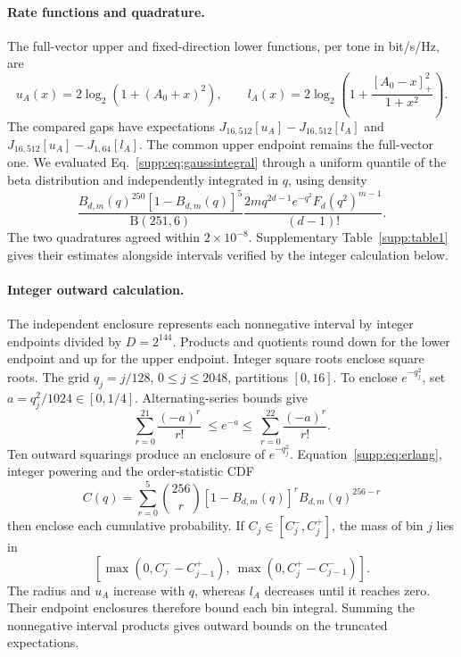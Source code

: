 \documentclass[10pt,letterpaper]{article}
\begin{document}
\paragraph{Rate functions and quadrature.}
The full-vector upper and fixed-direction lower functions, per tone in bit/s/Hz, are
\begin{equation}
 u_A(x)=2\log_2\!\left(1+(A_0+x)^2\right),\qquad
 l_A(x)=2\log_2\!\left(1+\frac{[A_0-x]_+^2}{1+x^2}\right).
 \label{supp:eq:gaussrates}
\end{equation}
The compared gaps have expectations \(J_{16,512}[u_A]-J_{16,512}[l_A]\) and
\(J_{16,512}[u_A]-J_{1,64}[l_A]\). The common upper endpoint remains the full-vector one. We evaluated Eq.~\eqref{supp:eq:gaussintegral} through a uniform quantile of the beta distribution and independently integrated in \(q\), using density
\begin{equation}
 \frac{B_{d,m}(q)^{250}[1-B_{d,m}(q)]^5}{\mathrm B(251,6)}
 \frac{2m q^{2d-1}e^{-q^2}F_d(q^2)^{m-1}}{(d-1)!}.
\end{equation}
The two quadratures agreed within \(2\times10^{-8}\). Supplementary Table~\ref{supp:table1} gives their estimates alongside intervals verified by the integer calculation below.

\paragraph{Integer outward calculation.}
The independent enclosure represents each nonnegative interval by integer endpoints divided by \(D=2^{144}\). Products and quotients round down for the lower endpoint and up for the upper endpoint. Integer square roots enclose square roots. The grid \(q_j=j/128\), \(0\leq j\leq2048\), partitions \([0,16]\). To enclose \(e^{-q_j^2}\), set \(a=q_j^2/1024\in[0,1/4]\). Alternating-series bounds give
\begin{equation}
 \sum_{r=0}^{21}\frac{(-a)^r}{r!}
 \ \leq e^{-a}\leq\
 \sum_{r=0}^{22}\frac{(-a)^r}{r!}.
\end{equation}
Ten outward squarings produce an enclosure of \(e^{-q_j^2}\). Equation~\eqref{supp:eq:erlang}, integer powering and the order-statistic CDF
\begin{equation}
 C(q)=\sum_{r=0}^{5}\binom{256}{r}
       [1-B_{d,m}(q)]^r B_{d,m}(q)^{256-r}
 \label{supp:eq:ordercdf}
\end{equation}
then enclose each cumulative probability. If \(C_j\in[C_j^-,C_j^+]\), the mass of bin \(j\) lies in
\[
 \left[\max(0,C_j^--C_{j-1}^+),\
       \max(0,C_j^+-C_{j-1}^-)\right].
\]
The radius and \(u_A\) increase with \(q\), whereas \(l_A\) decreases until it reaches zero. Their endpoint enclosures therefore bound each bin integral. Summing the nonnegative interval products gives outward bounds on the truncated expectations.
\end{document}
